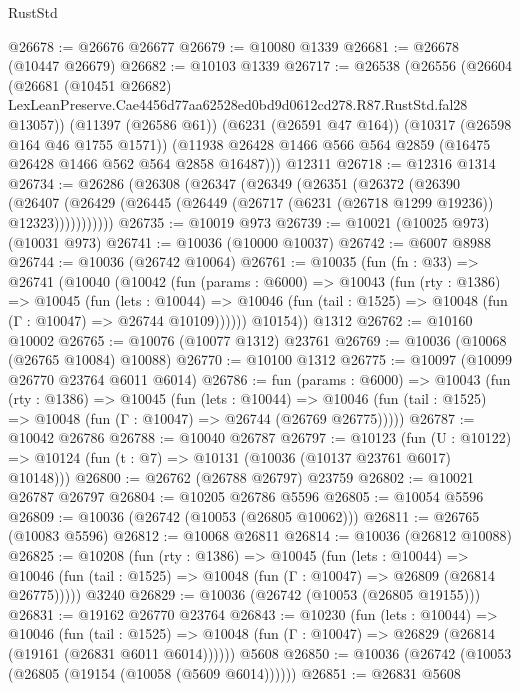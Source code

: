 \begin{lexlean}{RustStd}
\begin{coremodule}
{{@26678 := @26676 @26677
@26679 := @10080 @1339
@26681 := @26678 (@10447 @26679)
@26682 := @10103 @1339
@26717 := @26538
    (@26556
      (@26604
        (@26681
          (@10451 @26682)
          LexLeanPreserve.Cae4456d77aa62528ed0bd9d0612cd278.R87.RustStd.fal28
          @13057))
      (@11397 (@26586 @61))
      (@6231 (@26591 @47 @164))
      (@10317 (@26598 @164 @46 @1755 @1571))
      (@11938 @26428 @1466 @566 @564 @2859 (@16475 @26428 @1466 @562 @564 @2858 @16487)))
    @12311
@26718 := @12316 @1314
@26734 := @26286
    (@26308
      (@26347
        (@26349
          (@26351
            (@26372
              (@26390
                (@26407
                  (@26429 (@26445 (@26449 (@26717 (@6231 (@26718 @1299 @19236)) @12323)))))))))))
@26735 := @10019 @973
@26739 := @10021 (@10025 @973) (@10031 @973)
@26741 := @10036 (@10000 @10037)
@26742 := @6007 @8988
@26744 := @10036 (@26742 @10064)
@26761 := @10035
    (fun (fn : @33) =>
    @26741
      (@10040
        (@10042
          (fun (params : @6000) =>
          @10043
            (fun (rty : @1386) =>
            @10045
              (fun (lets : @10044) =>
              @10046 (fun (tail : @1525) => @10048 (fun (Γ : @10047) => @26744 @10109))))))
        @10154))
    @1312
@26762 := @10160 @10002
@26765 := @10076 (@10077 @1312) @23761
@26769 := @10036 (@10068 (@26765 @10084) @10088)
@26770 := @10100 @1312
@26775 := @10097 (@10099 @26770 @23764 @6011 @6014)
@26786 := fun (params : @6000) =>
  @10043
    (fun (rty : @1386) =>
    @10045
      (fun (lets : @10044) =>
      @10046 (fun (tail : @1525) => @10048 (fun (Γ : @10047) => @26744 (@26769 @26775)))))
@26787 := @10042 @26786
@26788 := @10040 @26787
@26797 := @10123
    (fun (U : @10122) => @10124 (fun (t : @7) => @10131 (@10036 (@10137 @23761 @6017) @10148)))
@26800 := @26762 (@26788 @26797) @23759
@26802 := @10021 @26787 @26797
@26804 := @10205 @26786 @5596
@26805 := @10054 @5596
@26809 := @10036 (@26742 (@10053 (@26805 @10062)))
@26811 := @26765 (@10083 @5596)
@26812 := @10068 @26811
@26814 := @10036 (@26812 @10088)
@26825 := @10208
    (fun (rty : @1386) =>
    @10045
      (fun (lets : @10044) =>
      @10046 (fun (tail : @1525) => @10048 (fun (Γ : @10047) => @26809 (@26814 @26775)))))
    @3240
@26829 := @10036 (@26742 (@10053 (@26805 @19155)))
@26831 := @19162 @26770 @23764
@26843 := @10230
    (fun (lets : @10044) =>
    @10046
      (fun (tail : @1525) =>
      @10048 (fun (Γ : @10047) => @26829 (@26814 (@19161 (@26831 @6011 @6014))))))
    @5608
@26850 := @10036 (@26742 (@10053 (@26805 (@19154 (@10058 (@5609 @6014))))))
@26851 := @26831 @5608
}}
\end{coremodule}
\end{lexlean}
